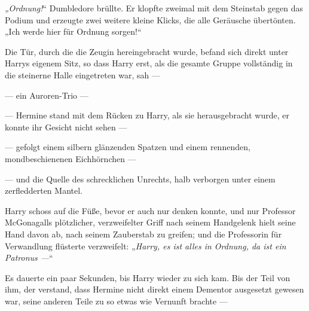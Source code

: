 \emph{„Ordnung!}“ Dumbledore brüllte. Er klopfte zweimal mit dem Steinstab gegen das Podium und erzeugte zwei weitere kleine Klicks, die alle Geräusche übertönten.
„Ich werde hier für Ordnung sorgen!“

Die Tür, durch die die Zeugin hereingebracht wurde, befand sich direkt unter Harrys eigenem Sitz, so dass Harry erst, als die gesamte Gruppe vollständig in die steinerne Halle eingetreten war, sah —




— ein Auroren-Trio —

— Hermine stand mit dem Rücken zu Harry, als sie herausgebracht wurde, er konnte ihr Gesicht nicht sehen —

— gefolgt einem silbern glänzenden Spatzen und einem rennenden, mondbeschienenen Eichhörnchen —

— und die Quelle des schrecklichen Unrechts, halb verborgen unter einem zerfledderten Mantel.

Harry schoss auf die Füße, bevor er auch nur denken konnte, und nur Professor McGonagalls plötzlicher, verzweifelter Griff nach seinem Handgelenk hielt seine Hand davon ab, nach seinem Zauberstab zu greifen; und die Professorin für Verwandlung flüsterte verzweifelt:
„\emph{Harry, es ist alles in Ordnung, da ist ein Patronus —}“

Es dauerte ein paar Sekunden, bis Harry wieder zu sich kam. Bis der Teil von ihm, der verstand, dass Hermine nicht direkt einem Dementor ausgesetzt gewesen war, seine anderen Teile zu so etwas wie Vernunft brachte —

